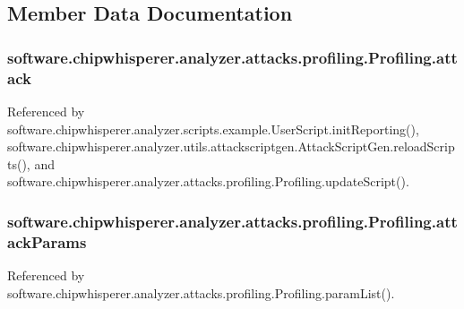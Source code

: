 \subsection{Member Data Documentation}
\hypertarget{classsoftware_1_1chipwhisperer_1_1analyzer_1_1attacks_1_1profiling_1_1Profiling_af329fa2066c563ce7b0af5c080b207a1}{}
\subsubsection[{attack}]{\setlength{\rightskip}{0pt plus 5cm}software.\+chipwhisperer.\+analyzer.\+attacks.\+profiling.\+Profiling.\+attack}\label{classsoftware_1_1chipwhisperer_1_1analyzer_1_1attacks_1_1profiling_1_1Profiling_af329fa2066c563ce7b0af5c080b207a1}


Referenced by software.\+chipwhisperer.\+analyzer.\+scripts.\+example.\+User\+Script.\+init\+Reporting(), software.\+chipwhisperer.\+analyzer.\+utils.\+attackscriptgen.\+Attack\+Script\+Gen.\+reload\+Scripts(), and software.\+chipwhisperer.\+analyzer.\+attacks.\+profiling.\+Profiling.\+update\+Script().

\hypertarget{classsoftware_1_1chipwhisperer_1_1analyzer_1_1attacks_1_1profiling_1_1Profiling_ae20255f592a44b7a184d1859c584337f}{}
\subsubsection[{attack\+Params}]{\setlength{\rightskip}{0pt plus 5cm}software.\+chipwhisperer.\+analyzer.\+attacks.\+profiling.\+Profiling.\+attack\+Params}\label{classsoftware_1_1chipwhisperer_1_1analyzer_1_1attacks_1_1profiling_1_1Profiling_ae20255f592a44b7a184d1859c584337f}


Referenced by software.\+chipwhisperer.\+analyzer.\+attacks.\+profiling.\+Profiling.\+param\+List().

